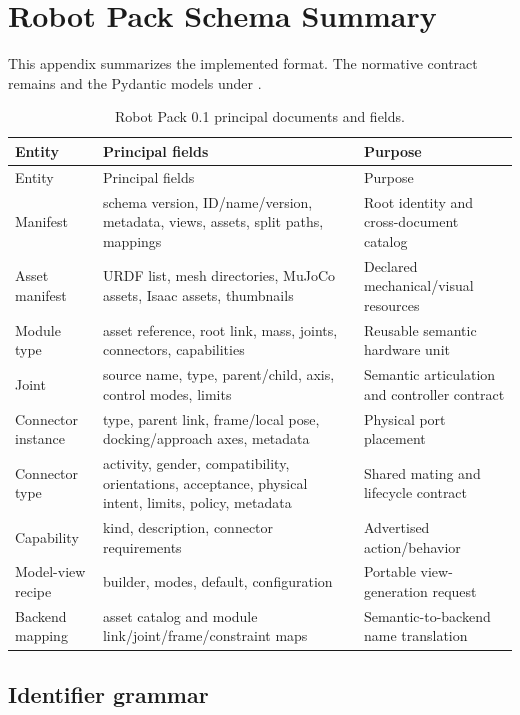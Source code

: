 \section{Robot Pack Schema Summary}
\label{app:schema}

This appendix summarizes the implemented format. The normative contract remains
 and the Pydantic models under
.

\begin{longtable}{L{0.24\textwidth}L{0.25\textwidth}L{0.39\textwidth}}
\caption{Robot Pack 0.1 principal documents and fields.}
\label{tab:schema-summary}\\
\toprule
Entity & Principal fields & Purpose \\
\midrule
\endfirsthead
\toprule
Entity & Principal fields & Purpose \\
\midrule
\endhead
Manifest & schema version, ID/name/version, metadata, views, assets, split paths,
mappings & Root identity and cross-document catalog \\
Asset manifest & URDF list, mesh directories, MuJoCo assets, Isaac assets, thumbnails &
Declared mechanical/visual resources \\
Module type & asset reference, root link, mass, joints, connectors, capabilities &
Reusable semantic hardware unit \\
Joint & source name, type, parent/child, axis, control modes, limits &
Semantic articulation and controller contract \\
Connector instance & type, parent link, frame/local pose, docking/approach axes,
metadata & Physical port placement \\
Connector type & activity, gender, compatibility, orientations, acceptance, physical
intent, limits, policy, metadata & Shared mating and lifecycle contract \\
Capability & kind, description, connector requirements & Advertised action/behavior \\
Model-view recipe & builder, modes, default, configuration & Portable view-generation request \\
Backend mapping & asset catalog and module link/joint/frame/constraint maps &
Semantic-to-backend name translation \\
\bottomrule
\end{longtable}

\subsection{Identifier grammar}


